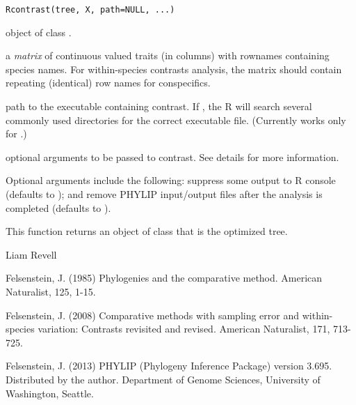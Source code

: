 \documentclass[a4paper]{book}
\begin{document}
%
\begin{Usage}
\begin{verbatim}
Rcontrast(tree, X, path=NULL, ...)
\end{verbatim}
\end{Usage}
%
\begin{Arguments}
\begin{ldescription}
\item[\code{tree}] object of class .
\item[\code{X}] a \emph{matrix} of continuous valued traits (in columns) with rownames containing species names. For within-species contrasts analysis, the matrix should contain repeating (identical) row names for conspecifics.
\item[\code{path}] path to the executable containing contrast. If , the R will search several commonly used directories for the correct executable file. (Currently works only for .)
\item[\code{...}] optional arguments to be passed to contrast. See details for more information.
\end{ldescription}
\end{Arguments}
%
\begin{Details}\relax
Optional arguments include the following:  suppress some output to R console (defaults to ); and  remove PHYLIP input/output files after the analysis is completed (defaults to ).
\end{Details}
%
\begin{Value}
This function returns an object of class  that is the optimized tree.
\end{Value}
%
\begin{Author}\relax
Liam Revell 
\end{Author}
%
\begin{References}\relax
Felsenstein, J. (1985) Phylogenies and the comparative method. American Naturalist, 125, 1-15.

Felsenstein, J. (2008) Comparative methods with sampling error and within-species variation: Contrasts revisited and revised. American Naturalist, 171, 713-725.

Felsenstein, J. (2013) PHYLIP (Phylogeny Inference Package) version 3.695. Distributed by the author. Department of Genome Sciences, University of Washington, Seattle.
\end{References}
\end{document}
